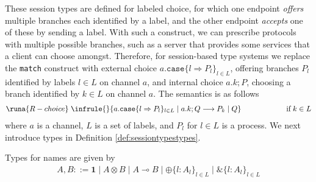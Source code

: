 These session types are defined for labeled choice, for which one endpoint \textit{offers} multiple branches each identified by a label, and the other endpoint \textit{accepts} one of these by sending a label. With such a construct, we can prescribe protocols with multiple possible branches, such as a server that provides some services that a client can choose amongst. Therefore, for session-based type systems we replace the \texttt{match} construct with external choice $a.\texttt{case}\{l \Rightarrow P_l\}_{l\in L}$, offering branches $P_l$ identified by labels $l \in L$ on channel $a$, and internal choice $a.k ; P$, choosing a branch identified by $k \in L$ on channel $a$. The semantics is as follows
\begin{align*}
    \runa{R-choice}\; \infrule{}{a.\texttt{case}\{l \Rightarrow P_l\}_{l\in L} \mid a.k ; Q\longrightarrow P_k \mid Q}\kern6em \text{if}\; k\in L
\end{align*}
where $a$ is a channel, $L$ is a set of labels, and $P_l$ for $l\in L$ is a process. We next introduce types in Definition \ref{def:sessiontypestypes}.

\begin{defi}
Types for names are given by
\begin{align*}
    A,B ::= \mathbf{1} \mid A \otimes B \mid A \multimap B \mid \oplus\{l : A_l\}_{l\in L} \mid \&\{l : A_l\}_{l\in L}
\end{align*}
\label{def:sessiontypestypes}
\end{defi}

